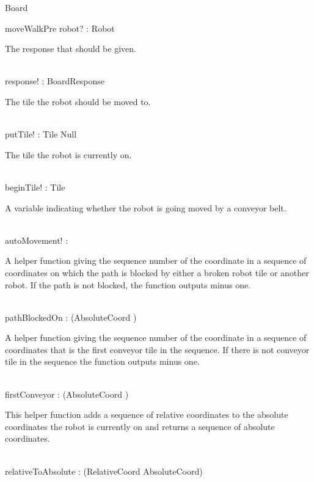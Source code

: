 \begin{class}{Board}
\begin{nobottomschema}{moveWalkPre}
robot? : Robot \\
\begin{zpar}
The response that should be given.
\end{zpar} \\
response! : BoardResponse \\
\begin{zpar}
The tile the robot should be moved to.
\end{zpar} \\
putTile! : Tile \cup Null \\
\begin{zpar}
The tile the robot is currently on.
\end{zpar} \\
beginTile! : Tile \\
\begin{zpar}
A variable indicating whether the robot is going moved by a conveyor belt.
\end{zpar} \\
autoMovement! : \bool \\
\end{nobottomschema}
\znewpage
\begin{nobothschema}
\begin{zpar}
A helper function giving the sequence number of the coordinate in a sequence of coordinates on which the path is blocked by either a broken robot tile or another robot. If the path is not blocked, the function outputs minus one.
\end{zpar} \\
pathBlockedOn : \power (\seq AbsoluteCoord \fun \nat) \\
\begin{zpar}
A helper function giving the sequence number of the coordinate in a sequence of coordinates that is the first conveyor tile in the sequence. If there is not conveyor tile in the sequence the function outputs minus one.
\end{zpar} \\
firstConveyor : \power (\seq AbsoluteCoord \fun \nat) \\
\begin{zpar}
This helper function adds a sequence of relative coordinates to the absolute coordinates the robot is currently on and returns a sequence of absolute coordinates.
\end{zpar} \\
relativeToAbsolute : \power (\seq RelativeCoord \pfun \seq AbsoluteCoord) \\
\begin{zpar}

\end{zpar}
\end{nobothschema}
\end{class}
